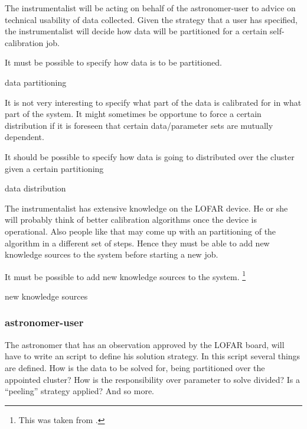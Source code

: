 \documentclass[]{lofar}
\begin{document}
        The instrumentalist will be acting on behalf of the
        astronomer-user to advice on technical usability of data
        collected. Given the strategy that a user has specified, the
        instrumentalist will decide how data will be partitioned for a
        certain self-calibration job.

        \begin{requirement}
          It must be possible to specify how data is to be partitioned.
          \caption{data partitioning\label{req:data-partitioning}}
        \end{requirement}

        It is not very interesting to specify what part of the data is
        calibrated for in what part of the system. It might sometimes
        be opportune to force a certain distribution if it is foreseen
        that certain data/parameter sets are mutually dependent.

        \begin{requirement}
          It should be possible to specify how data is going to
          distributed over the cluster given a certain partitioning
          \caption{data distribution\label{req:data-distribution}}
        \end{requirement}

        The instrumentalist has extensive knowledge on the LOFAR
        device. He or she will probably think of better calibration
        algorithms once the device is operational. Also people like
        that may come up with an partitioning of the algorithm in a
        different set of steps. Hence they must be able to add new
        knowledge sources to the system before starting a new job.

        \begin{requirement}
          It must be possible to add new knowledge sources to the
          system.
          \footnote{This was taken from \cite{HOO03}.\label{copied-footnote}}
          \caption{new knowledge sources\label{req:knowledge-sources}}
        \end{requirement}

      \subsubsection{astronomer-user}

        The astronomer that has an observation approved by the LOFAR
        board, will have to write an script to define his solution
        strategy. In this script several things are defined. How is the data to be
        solved for, being partitioned over the appointed cluster? How
        is the responsibility over parameter to solve divided? Is a
        ``peeling'' strategy applied? And so more.
\end{document}
